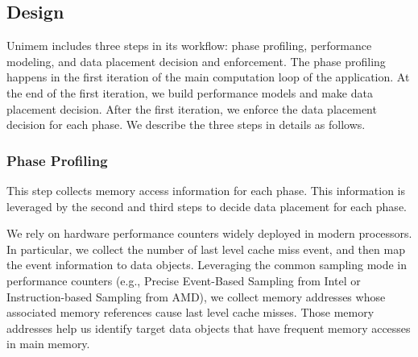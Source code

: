 \subsection{Design}
\label{sec:design}
Unimem includes three %
steps in its workflow: phase profiling, performance modeling, and data placement decision and enforcement.
The phase profiling happens in the first iteration of the main computation loop of the application.
At the end of the first iteration, we build performance models and
make data placement decision. After the first iteration, we enforce
the data placement decision for each phase.
We describe the three %
steps in details as follows.
\vspace{-5pt}

\subsubsection{Phase Profiling}
This step collects memory access information for each phase. This information is leveraged by the second and third steps to decide data placement for each phase.

We rely on hardware performance counters widely deployed in modern processors. 
In particular, we collect the number of last level cache miss event,
and then map the event information to data objects. Leveraging the common sampling mode in performance counters (e.g., Precise Event-Based Sampling from Intel or Instruction-based Sampling from AMD),
we collect memory addresses whose associated memory references cause last level cache misses. 
Those memory addresses help us identify target data objects that have frequent memory accesses in main memory.

